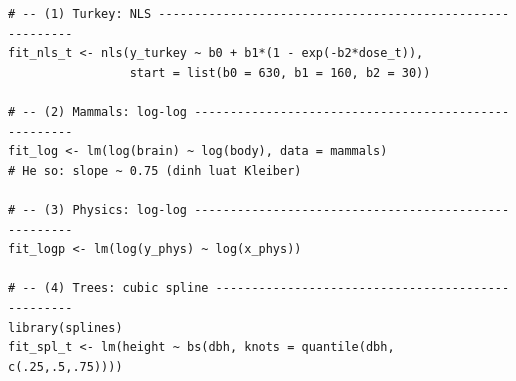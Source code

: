 \begin{lstlisting}[style=Rstyle]
# -- (1) Turkey: NLS ----------------------------------------------------------
fit_nls_t <- nls(y_turkey ~ b0 + b1*(1 - exp(-b2*dose_t)),
                 start = list(b0 = 630, b1 = 160, b2 = 30))

# -- (2) Mammals: log-log -----------------------------------------------------
fit_log <- lm(log(brain) ~ log(body), data = mammals)
# He so: slope ~ 0.75 (dinh luat Kleiber)

# -- (3) Physics: log-log -----------------------------------------------------
fit_logp <- lm(log(y_phys) ~ log(x_phys))

# -- (4) Trees: cubic spline --------------------------------------------------
library(splines)
fit_spl_t <- lm(height ~ bs(dbh, knots = quantile(dbh, c(.25,.5,.75))))
\end{lstlisting}

